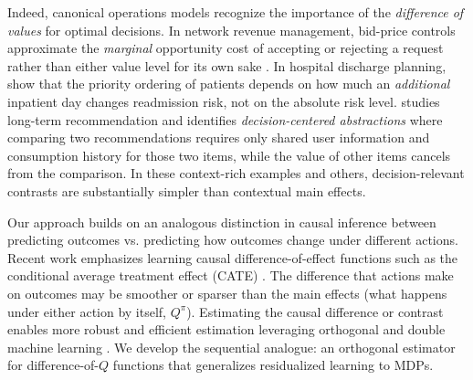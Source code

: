\documentclass[opre,nonblindrev]{informs4}
\newcommand{\blipadv}{\tau}
\begin{document}
{Indeed, canonical operations models recognize the importance of the \textit{difference of values} for optimal decisions. In network revenue management, bid-price controls approximate the \textit{marginal} opportunity cost of accepting or rejecting a request rather than either value level for its own sake \citep{talluri1998analysis,adelman2007dynamic}. In hospital discharge planning, \citet{shi2021timing} show that the priority ordering of patients depends on how much an \textit{additional} inpatient day changes readmission risk, not on the absolute risk level. \citet{maystre2023optimizing} studies long-term recommendation and identifies \textit{decision-centered abstractions} where comparing two recommendations requires only shared user information and consumption history for those two items, while the value of other items cancels from the comparison. In these context-rich examples and others, decision-relevant contrasts are substantially simpler than contextual main effects.}


Our approach builds on an analogous distinction in causal inference between predicting outcomes vs. predicting how outcomes change under different actions. Recent work emphasizes learning causal difference-of-effect functions such as the conditional average treatment effect (CATE) \citep{wager2018estimation,foster2019orthogonal,kunzel2019metalearners,kennedy2020optimal}. The difference that actions make on outcomes may be smoother or sparser than the main effects (what happens under either action by itself, $Q^\pi$). Estimating the causal difference or contrast enables more robust and efficient estimation leveraging orthogonal and double machine learning \citep{chernozhukov2018double,kennedy2022semiparametric}. We develop the sequential analogue: an orthogonal estimator for difference-of-$Q$ functions that generalizes residualized learning \citep{nie2021quasi} to MDPs.




\end{document}
